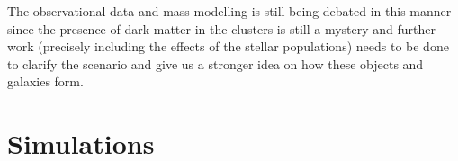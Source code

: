 The observational data and mass modelling is still being debated in this manner since the presence of dark matter in the clusters is still a mystery and further work (precisely including the effects of the stellar populations) needs to be done to clarify the scenario and give us a stronger idea on how these objects and galaxies form. 

\section{Simulations}

